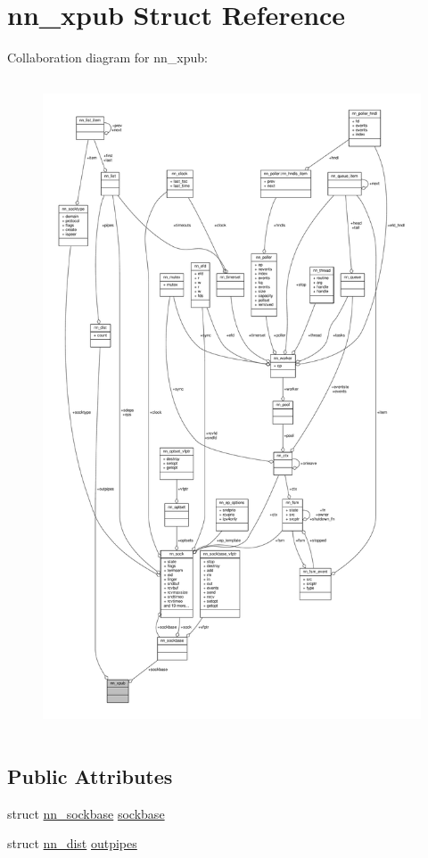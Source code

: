 \hypertarget{structnn__xpub}{}\section{nn\+\_\+xpub Struct Reference}
\label{structnn__xpub}


Collaboration diagram for nn\+\_\+xpub\+:\nopagebreak
\begin{figure}[H]
\begin{center}
\leavevmode
\includegraphics[height=550pt]{structnn__xpub__coll__graph}
\end{center}
\end{figure}
\subsection*{Public Attributes}
\begin{DoxyCompactItemize}
\item 
struct \hyperlink{structnn__sockbase}{nn\+\_\+sockbase} \hyperlink{structnn__xpub_adf60875a20e0267e62049b1e2247dd84}{sockbase}
\item 
struct \hyperlink{structnn__dist}{nn\+\_\+dist} \hyperlink{structnn__xpub_a924e28cc57e4c4d0b08f22c4958f70cf}{outpipes}
\end{DoxyCompactItemize}


